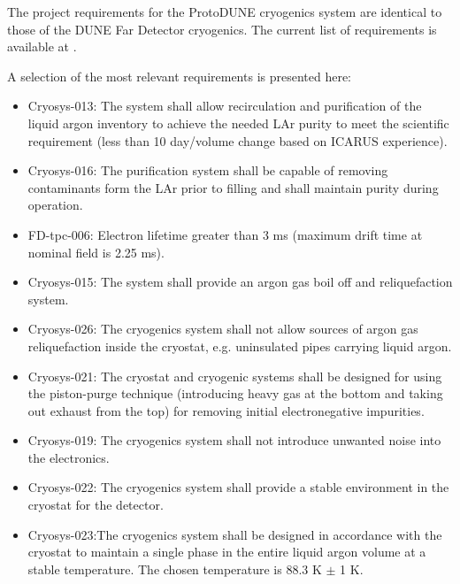 


The project requirements for the ProtoDUNE cryogenics system are identical to those of the DUNE Far Detector cryogenics. The current list 
of requirements is available at \cite{DUNE_FD_cryogenics_req}. 

A selection of the most relevant requirements is presented here:
%
\begin{itemize}
\item Cryosys-013: The system shall allow recirculation and purification of the liquid argon inventory to achieve the needed LAr purity to meet the scientific requirement (less than 10 day/volume change based on ICARUS experience).
\item  Cryosys-016: The purification system shall be capable of removing contaminants form the LAr prior to filling and shall maintain purity during operation.
\item  FD-tpc-006: Electron lifetime greater than 3 ms (maximum drift time at nominal field is 2.25 ms).
\item  Cryosys-015: The system shall provide an argon gas boil off and reliquefaction system.
\item Cryosys-026: The cryogenics system shall not allow sources of argon gas reliquefaction inside the cryostat, e.g. uninsulated pipes carrying liquid argon.
\item  Cryosys-021: The cryostat and cryogenic systems shall be designed for using the piston-purge technique (introducing heavy gas at the bottom and taking out exhaust from the top) for removing initial electronegative impurities.
\item  Cryosys-019: The cryogenics system shall not introduce unwanted noise into the electronics.
\item  Cryosys-022: The cryogenics system shall provide a stable environment in the cryostat for the detector.
\item  Cryosys-023:The cryogenics system shall be designed in accordance with the cryostat to maintain a single phase in the entire liquid argon volume at a stable temperature. The chosen temperature is 88.3 K $\pm$ 1 K.
\end{itemize}

